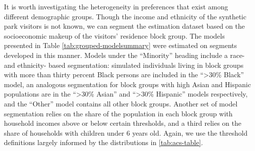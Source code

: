 \documentclass[3p, authoryear, review]{elsarticle} %
\begin{document}
It is worth investigating the heterogeneity in preferences that exist among
different demographic groups. Though the income and ethnicity of the synthetic
park visitors is not known, we can segment the estimation dataset based on the
socioeconomic makeup of the visitors' residence block group. The models presented in
Table \ref{tab:grouped-modelsummary} were estimated on segments developed in
this manner. Models under the ``Minority'' heading include a race- and ethnicity-
based segmentation: simulated individuals living in block groups with more than
thirty percent Black persons are included in the ``\textgreater30\% Black'' model, an
analogous segmentation for block groups with high Asian and Hispanic populations
are in the ``\textgreater30\% Asian'' and ``\textgreater30\% Hispanic'' models respectively, and the ``Other''
model contains all other block groups. Another set of model segmentation relies
on the share of the population in each block group with household incomes above
or below certain thresholds, and a third relies on the share of households with
children under 6 years old. Again, we use the threshold definitions largely
informed by the distributions in \ref{tab:acs-table}.
\end{document}
